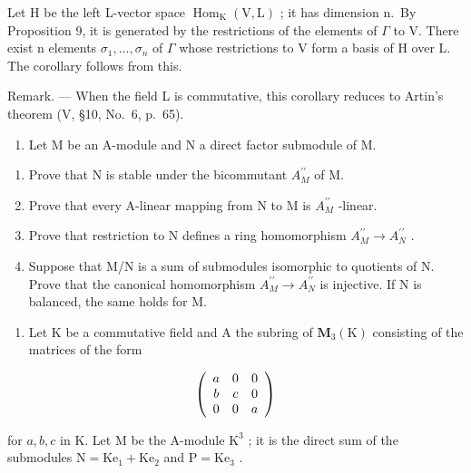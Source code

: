 Let H be the left L-vector space \(\operatorname{Hom}_{\mathrm{K}}(\mathrm{V},\mathrm{L})\) ; it has dimension n.~By Proposition 9, it is generated by the restrictions of the elements of \(\Gamma\) to V. There exist n elements \(\sigma_{1},\ldots,\sigma_{n}\) of \(\Gamma\) whose restrictions to V form a basis of H over L. The corollary follows from this.

Remark. --- When the field L is commutative, this corollary reduces to Artin's theorem (V, §10, No.~6, p.~65).


\begin{enumerate}
\def\labelenumi{\arabic{enumi})}
\tightlist
\item
  Let M be an A-module and N a direct factor submodule of M.
\end{enumerate}

\begin{enumerate}
\def\labelenumi{\alph{enumi})}
\item
  Prove that N is stable under the bicommutant \(A_{M}^{\prime\prime}\) of M.
\item
  Prove that every A-linear mapping from N to M is \(A_{M}^{\prime\prime}\) -linear.
\item
  Prove that restriction to N defines a ring homomorphism \(A_{M}^{\prime\prime} \to A_{N}^{\prime\prime}\) .
\item
  Suppose that M/N is a sum of submodules isomorphic to quotients of N. Prove that the canonical homomorphism \(A_{M}^{\prime\prime} \rightarrow A_{N}^{\prime\prime}\) is injective. If N is balanced, the same holds for M.
\end{enumerate}

\begin{enumerate}
\def\labelenumi{\arabic{enumi})}
\setcounter{enumi}{1}
\tightlist
\item
  Let K be a commutative field and A the subring of \(\mathbf{M}_{3}(\mathrm{K})\) consisting of the matrices of the form
\end{enumerate}

\[
\left( \begin{array}{c c c} a & 0 & 0 \\ b & c & 0 \\ 0 & 0 & a \end{array} \right)
\]

for \(a, b, c\) in K. Let M be the A-module \(\mathrm{K}^3\) ; it is the direct sum of the submodules \(\mathrm{N} = \mathrm{Ke}_1 + \mathrm{Ke}_2\) and \(\mathrm{P} = \mathrm{Ke}_3\) .

